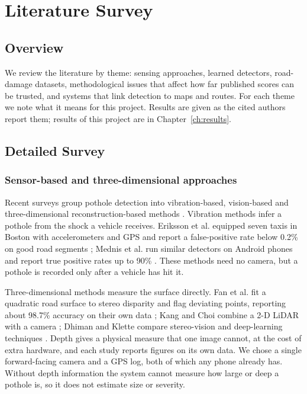 \chapter{Literature Survey}\label{ch:literature}

\section{Overview}
We review the literature by theme: sensing approaches, learned detectors, road-damage datasets, methodological issues that affect how far published scores can be trusted, and systems that link detection to maps and routes. For each theme we note what it means for this project. Results are given as the cited authors report them; results of this project are in Chapter~\ref{ch:results}.

\section{Detailed Survey}

\subsection{Sensor-based and three-dimensional approaches}
Recent surveys group pothole detection into vibration-based, vision-based and three-dimensional reconstruction-based methods \cite{kim2022review,ma2022review,safyari2024review}. Vibration methods infer a pothole from the shock a vehicle receives. Eriksson et al. equipped seven taxis in Boston with accelerometers and GPS and report a false-positive rate below 0.2\% on good road segments \cite{eriksson2008pothole}; Mednis et al. run similar detectors on Android phones and report true positive rates up to 90\% \cite{mednis2011real}. These methods need no camera, but a pothole is recorded only after a vehicle has hit it.

Three-dimensional methods measure the surface directly. Fan et al. fit a quadratic road surface to stereo disparity and flag deviating points, reporting about 98.7\% accuracy on their own data \cite{fan2020pothole}; Kang and Choi combine a 2-D LiDAR with a camera \cite{kang2017pothole}; Dhiman and Klette compare stereo-vision and deep-learning techniques \cite{dhiman2020pothole}. Depth gives a physical measure that one image cannot, at the cost of extra hardware, and each study reports figures on its own data. We chose a single forward-facing camera and a GPS log, both of which any phone already has. Without depth information the system cannot measure how large or deep a pothole is, so it does not estimate size or severity.

